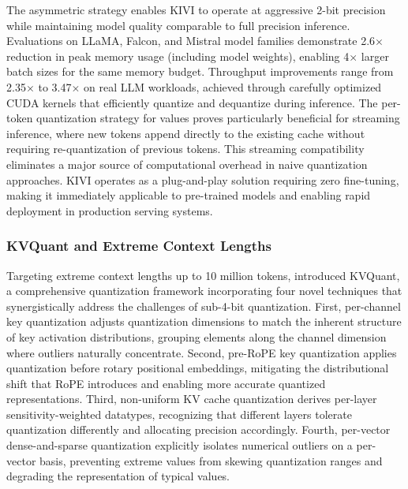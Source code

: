 The asymmetric strategy enables KIVI to operate at aggressive 2-bit precision while maintaining model quality comparable to full precision inference. Evaluations on LLaMA, Falcon, and Mistral model families demonstrate 2.6$\times$ reduction in peak memory usage (including model weights), enabling 4$\times$ larger batch sizes for the same memory budget. Throughput improvements range from 2.35$\times$ to 3.47$\times$ on real LLM workloads, achieved through carefully optimized CUDA kernels that efficiently quantize and dequantize during inference. The per-token quantization strategy for values proves particularly beneficial for streaming inference, where new tokens append directly to the existing cache without requiring re-quantization of previous tokens. This streaming compatibility eliminates a major source of computational overhead in naive quantization approaches. KIVI operates as a plug-and-play solution requiring zero fine-tuning, making it immediately applicable to pre-trained models and enabling rapid deployment in production serving systems.

\subsubsection{KVQuant and Extreme Context Lengths}

Targeting extreme context lengths up to 10 million tokens, \citet{hooper2024kvquant} introduced KVQuant, a comprehensive quantization framework incorporating four novel techniques that synergistically address the challenges of sub-4-bit quantization. First, per-channel key quantization adjusts quantization dimensions to match the inherent structure of key activation distributions, grouping elements along the channel dimension where outliers naturally concentrate. Second, pre-RoPE key quantization applies quantization before rotary positional embeddings, mitigating the distributional shift that RoPE introduces and enabling more accurate quantized representations. Third, non-uniform KV cache quantization derives per-layer sensitivity-weighted datatypes, recognizing that different layers tolerate quantization differently and allocating precision accordingly. Fourth, per-vector dense-and-sparse quantization explicitly isolates numerical outliers on a per-vector basis, preventing extreme values from skewing quantization ranges and degrading the representation of typical values.

